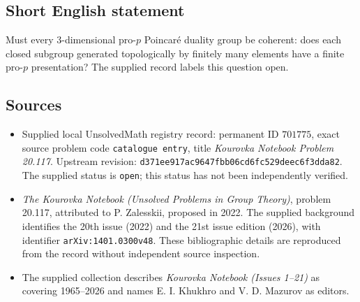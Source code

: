 \documentclass[11pt]{article}
\begin{document}
\subsection{Short English statement}
Must every \(3\)-dimensional pro-\(p\) Poincar\'e duality group be coherent: does each closed subgroup generated topologically by finitely many elements have a finite pro-\(p\) presentation? The supplied record labels this question open.
\subsection{Sources}
\begin{itemize}
\item Supplied local UnsolvedMath registry record: permanent ID \(701775\), exact source problem code \texttt{catalogue entry}, title \emph{Kourovka Notebook Problem 20.117}. Upstream revision: \texttt{d371ee917ac9647fbb06cd6fc529deec6f3dda82}. The supplied status is \texttt{open}; this status has not been independently verified.
\item \emph{The Kourovka Notebook (Unsolved Problems in Group Theory)}, problem 20.117, attributed to P. Zalesskii, proposed in 2022. The supplied background identifies the 20th issue (2022) and the 21st issue edition (2026), with identifier \texttt{arXiv:1401.0300v48}. These bibliographic details are reproduced from the record without independent source inspection.
\item The supplied collection describes \emph{Kourovka Notebook (Issues 1--21)} as covering 1965--2026 and names E. I. Khukhro and V. D. Mazurov as editors.
\end{itemize}
\end{document}
